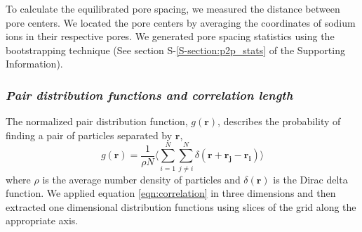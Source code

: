 \documentclass[journal=jpcbfk,manuscript=article]{achemso}
\begin{document}
  To calculate the equilibrated pore spacing, we measured the distance between
  pore centers. We located the pore centers by averaging the coordinates of sodium
  ions in their respective pores. We generated pore spacing statistics 
  using the bootstrapping technique (See section S-\ref{S-section:p2p_stats} of the
  Supporting Information).

%
  
  \subsubsection{\textit{Pair distribution functions and correlation length}}\label{section:correlation_length}

  The normalized pair distribution function, $g(\mathbf{r})$, describes
  the probability of finding a pair of particles separated by $\mathbf{r}$,
  \begin{equation}
	g(\mathbf{r})= \frac{1}{\rho N} \Bigg \langle \sum_{i=1}^{N}\sum_{j\neq i}^{N} \delta(\mathbf{r}+\mathbf{r_j}-\mathbf{r_i}) \Bigg \rangle
	\label{eqn:correlation}
  \end{equation}
  where $\rho$ is the average number density of particles and
  $\delta(\mathbf{r})$ is the Dirac delta function\cite{kuriabova_linear_2010}.
  We applied equation \ref{eqn:correlation} in three dimensions and then
  extracted one dimensional distribution functions using slices of the grid
  along the appropriate axis.
\end{document}

